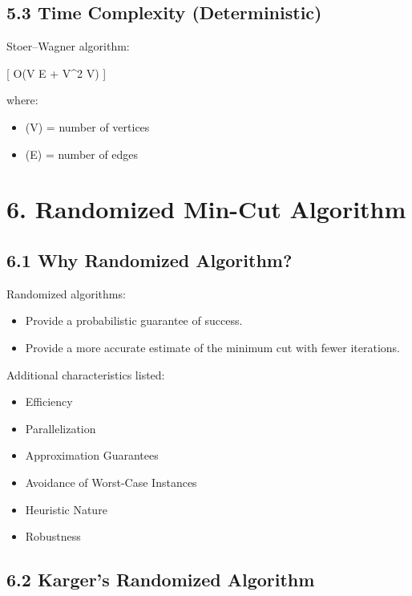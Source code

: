 \documentclass[12pt]{article}
\begin{document}
\bigskip

\subsection*{5.3 Time Complexity (Deterministic)}

Stoer–Wagner algorithm:

[
O(V \cdot E + V^2 \log V)
]

where:

\begin{itemize}
\item (V) = number of vertices
\item (E) = number of edges
\end{itemize}

\bigskip

\section*{6. Randomized Min-Cut Algorithm}

\subsection*{6.1 Why Randomized Algorithm?}

Randomized algorithms:

\begin{itemize}
\item Provide a probabilistic guarantee of success.
\item Provide a more accurate estimate of the minimum cut with fewer iterations.
\end{itemize}

Additional characteristics listed:

\begin{itemize}
\item Efficiency
\item Parallelization
\item Approximation Guarantees
\item Avoidance of Worst-Case Instances
\item Heuristic Nature
\item Robustness
\end{itemize}

\bigskip

\subsection*{6.2 Karger’s Randomized Algorithm}
\end{document}
